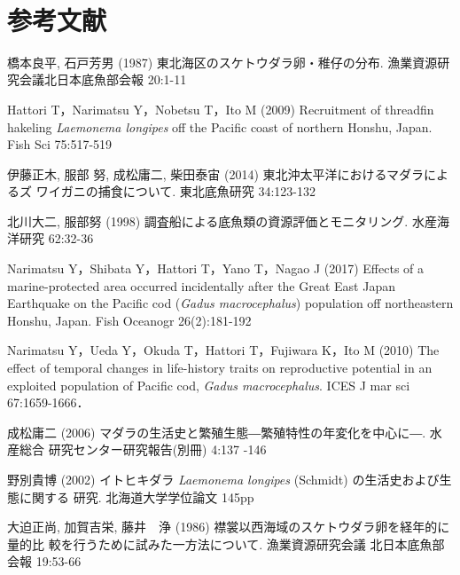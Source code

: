 \documentclass[11pt]{article} %
\begin{document}
\begin{linenumbers}
\ \ \ \ \ \ \ \ \ \ 
\section{参考文献}
\hangindent=30pt
\noindent
橋本良平, 石戸芳男 (1987) 東北海区のスケトウダラ卵・稚仔の分布. 漁業資源研究会議北日本底魚部会報 20:1-11

\hangindent=30pt
\noindent
Hattori T，Narimatsu Y，Nobetsu T，Ito M (2009) Recruitment of threadfin hakeling \textit{Laemonema longipes} off the Pacific coast of northern Honshu, Japan. Fish Sci 75:517-519


\hangindent=30pt
\noindent
伊藤正木, 服部 努, 成松庸二, 柴田泰宙 (2014) 東北沖太平洋におけるマダラによるズ
ワイガニの捕食について. 東北底魚研究 34:123-132

\hangindent=30pt
\noindent
北川大二, 服部努 (1998) 調査船による底魚類の資源評価とモニタリング. 水産海洋研究 62:32-36


\hangindent=30pt
\noindent
Narimatsu Y，Shibata Y，Hattori T，Yano T，Nagao J (2017) Effects of a marine-protected area occurred incidentally after the Great East Japan Earthquake on the Pacific cod (\textit{Gadus macrocephalus}) population off northeastern Honshu, Japan. Fish Oceanogr 26(2):181-192

\hangindent=30pt
\noindent
Narimatsu Y，Ueda Y，Okuda T，Hattori T，Fujiwara K，Ito M (2010) The effect of temporal changes in life-history traits on reproductive potential in an exploited population of Pacific cod, \textit{Gadus macrocephalus}. ICES J mar sci 67:1659-1666．

\hangindent=30pt
\noindent
成松庸二 (2006) マダラの生活史と繁殖生態―繁殖特性の年変化を中心に―. 水産総合
研究センター研究報告(別冊) 4:137 -146

\hangindent=30pt
\noindent
野別貴博 (2002) イトヒキダラ \textit{Laemonema longipes} (Schmidt) の生活史および生態に関する
研究. 北海道大学学位論文 145pp

\hangindent=30pt
\noindent
大迫正尚, 加賀吉栄, 藤井　浄 (1986) 襟裳以西海域のスケトウダラ卵を経年的に量的比
較を行うために試みた一方法について. 漁業資源研究会議 北日本底魚部会報 19:53-66


\end{linenumbers}
\end{document}
